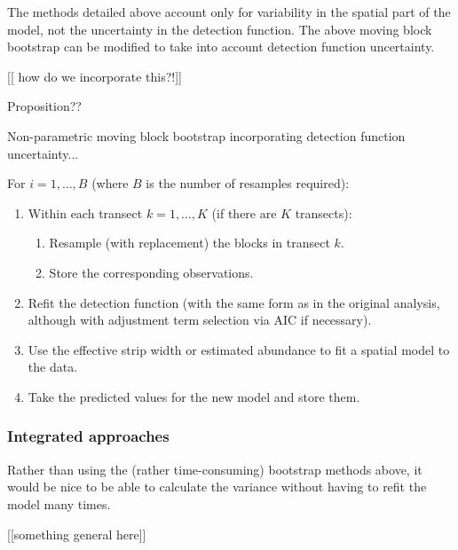 \documentclass[useAMS,referee]{biom}
\begin{document}
The methods detailed above account only for variability in the spatial part of the model, not the uncertainty in the detection function. The above moving block bootstrap can be modified to take into account detection function uncertainty.

[[ how do we incorporate this?!]]

Proposition??

Non-parametric moving block bootstrap incorporating detection function uncertainty...

For $i=1,\ldots,B$ (where $B$ is the number of resamples required):
\begin{enumerate}

	\item Within each transect $k=1,\ldots,K$ (if there are $K$ transects):
	\begin{enumerate}
		\item Resample (with replacement) the blocks in transect $k$.
		\item Store the corresponding observations.
	\end{enumerate}
	\item Refit the detection function (with the same form as in the original analysis, although with adjustment term selection via AIC if necessary).
	\item Use the effective strip width or estimated abundance to fit a spatial model to the data.
	\item Take the predicted values for the new model and store them.
\end{enumerate}


\subsubsection{Integrated approaches}

Rather than using the (rather time-consuming) bootstrap methods above, it would be nice to be able to calculate the variance without having to refit the model many times.

[[something general here]]
\end{document}
